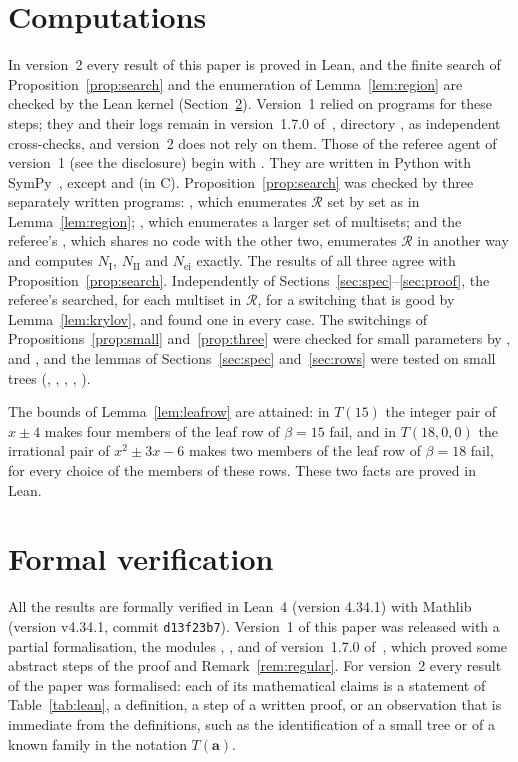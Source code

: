 \documentclass[11pt]{article}
\numberwithin{equation}{section}
\theoremstyle{remark}
\newcommand{\cR}{\mathcal R}
\newcommand{\bfa}{\mathbf a}
\newcommand{\NI}{N_{\mathrm I}}
\newcommand{\NII}{N_{\mathrm{II}}}
\newcommand{\Nei}{N_{\mathrm{ei}}}
\begin{document}
\section{Computations}\label{sec:comp}
In version~2 every result of this paper is proved in Lean, and the
finite search of Proposition~\ref{prop:search} and the enumeration of
Lemma~\ref{lem:region} are checked by the Lean kernel
(Section~\ref{sec:lean}). Version~1 relied on programs for these steps; they
and their logs remain in version~1.7.0 of~\cite{repo}, directory
, as independent cross-checks, and version~2
does not rely on them. Those of the referee agent of version~1 (see the
disclosure) begin with . They are written in Python with
SymPy~\cite{sympy}, except  and  (in C).
Proposition~\ref{prop:search} was checked by three separately written
programs: , which enumerates $\cR$ set by set as in
Lemma~\ref{lem:region}; , which enumerates a larger
set of multisets; and the referee's , which shares no code
with the other two, enumerates $\cR$ in another way and computes $\NI$, $\NII$
and $\Nei$ exactly. The results of all three agree with
Proposition~\ref{prop:search}. Independently of
Sections~\ref{sec:spec}--\ref{sec:proof}, the referee's 
searched, for each multiset in $\cR$, for a switching that is good by
Lemma~\ref{lem:krylov}, and found one in every case. The switchings of
Propositions~\ref{prop:small} and~\ref{prop:three} were checked for small
parameters by ,  and
, and the lemmas of Sections~\ref{sec:spec}
and~\ref{sec:rows} were tested on small trees (,
, , ,
).

The bounds of Lemma~\ref{lem:leafrow} are attained: in $T(15)$ the integer
pair of $x\pm4$ makes four members of the leaf row of $\beta=15$ fail, and in
$T(18,0,0)$ the irrational pair of $x^2\pm3x-6$ makes two members of the leaf
row of $\beta=18$ fail, for every choice of the members of these rows. These
two facts are proved in Lean.

\section{Formal verification}\label{sec:lean}
All the results are formally verified in Lean~4 (version 4.34.1) with
Mathlib~\cite{mathlib} (version v4.34.1, commit \texttt{d13f23b7}).
Version~1 of this paper was released with a partial formalisation, the modules
, ,
 and  of
version~1.7.0 of~\cite{repo}, which proved some abstract steps of the proof and
Remark~\ref{rem:regular}. For version~2 every result of the paper was
formalised: each of its mathematical claims is a statement of
Table~\ref{tab:lean}, a definition, a step of a written proof, or an
observation that is immediate from the definitions, such as the identification
of a small tree or of a known family in the notation $T(\bfa)$.
\end{document}
